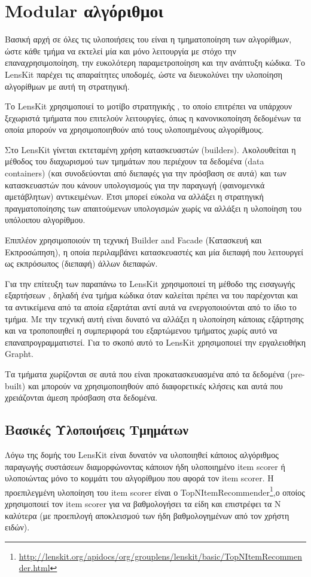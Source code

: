 \section{\en Modular \el αλγόριθμοι}
Βασική αρχή σε όλες τις υλοποιήσεις του είναι η τμηματοποίηση των αλγορίθμων, ώστε κάθε τμήμα να εκτελεί μία και μόνο λειτουργία με στόχο την επαναχρησιμοποίηση, την ευκολότερη παραμετροποίηση και την ανάπτυξη κώδικα. Το \en LensKit \el παρέχει τις απαραίτητες υποδομές, ώστε να διευκολύνει την υλοποίηση αλγορίθμων με αυτή τη στρατηγική. \par Το \en LensKit \el χρησιμοποιεί το μοτίβο στρατηγικής \cite{Gamma:1995:DPE:186897}, το οποίο επιτρέπει να υπάρχουν ξεχωριστά τμήματα που επιτελούν λειτουργίες, όπως η κανονικοποίηση δεδομένων τα οποία μπορούν να χρησιμοποιηθούν από τους υλοποιημένους αλγορίθμους. \par
Στο {\en LensKit} γίνεται εκτεταμένη χρήση κατασκευαστών (\en builders)\el. Ακολουθεί\-ται η μέθοδος του διαχωρισμού των τμημάτων που περιέχουν τα δεδομένα (\en data containers) \el (και συνοδεύονται από διεπαφές για την πρόσβαση σε αυτά) και των κατασκευαστών που κάνουν υπολογισμούς για την παραγωγή (φαινομενικά αμετάβλητων) αντικειμένων. Έτσι μπορεί εύκολα να αλλάξει η στρατηγική πραγματοποίησης των απαιτούμενων υπολογισμών χωρίς να αλλάξει η υλοποίηση του υπόλοιπου αλγορίθμου. \par
Επιπλέον χρησιμοποιούν τη τεχνική \en Builder and Facade \el\cite{Gamma:1995:DPE:186897} (Κατασκευή και Εκπροσώπηση), η οποία περιλαμβάνει κατασκευαστές και μία διεπαφή που λειτουργεί ως εκπρόσωπος (διεπαφή) άλλων διεπαφών. \par
Για την επίτευξη των παραπάνω το {\en LensKit} χρησιμοποιεί τη μέθοδο της εισαγωγής εξαρτήσεων \cite{mar96c}, δηλαδή ένα τμήμα κώδικα όταν καλείται πρέπει να του παρέχονται και τα αντικείμενα από τα αποία εξαρτάται αντί αυτά να ενεργοποιού\-νται από το ίδιο το τμήμα. Με την τεχνική αυτή είναι δυνατό να αλλάξει η υλοποίηση κάποιας εξάρτησης και να τροποποιηθεί η συμπεριφορά του εξαρτώμενου τμήματος χωρίς αυτό να επαναπρογραμματιστεί. Για το σκοπό αυτό το {\en LensKit} χρησιμοποιεί την εργαλειοθήκη {\en Grapht}. \par
Τα τμήματα χωρίζονται σε αυτά που είναι προκατασκευασμένα από τα δεδομένα (\en pre-built) \el και μπορούν να χρησιμοποιηθούν από διαφορετικές κλήσεις και αυτά που χρειάζονται άμεση πρόσβαση στα δεδομένα.
\subsection{Βασικές Υλοποιήσεις Τμημάτων}
Λόγω της δομής του \en LensKit \el είναι δυνατόν να υλοποιηθεί κάποιος αλγόριθμος παραγωγής συστάσεων διαμορφώνοντας κάποιον ήδη υλοποιημένο \en item scorer \el ή υλοποιώντας μόνο το κομμάτι του αλγορίθμου που αφορά τον \en item scorer. \el H προεπιλεγμένη υλοποίηση του \en item scorer \el είναι ο \en TopNItemRecommender\footnote{\url{http://lenskit.org/apidocs/org/grouplens/lenskit/basic/TopNItemRecommender.html}},\el ο οποίος χρησιμοποιεί τον \en item scorer \el για να βαθμολογήσει τα είδη και επιστρέφει τα Ν καλύτερα (με προεπιλογή αποκλεισμού των ήδη βαθμολογημένων από τον χρήστη ειδών).\el
